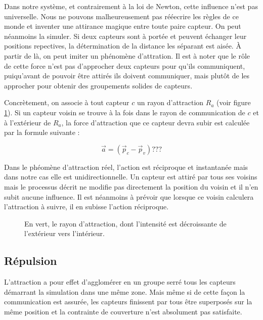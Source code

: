 \documentclass[10pt]{article}
\begin{document}
\begin{multicols}{2}
Dans notre système, et contrairement à la loi de Newton, cette
influence n'est pas universelle. Nous ne pouvons malheureusement pas
rééecrire les règles de ce monde et inventer une attirance magique
entre toute paire capteur. On peut néanmoins la simuler. Si deux
capteurs sont à portée et peuvent échanger leur positions repectives,
la détermination de la distance les séparant est aisée. \`A partir de
là, on peut imiter un phénomène d'attration. Il est à noter que le
rôle de cette force n'est pas d'approcher deux capteurs pour qu'ils
communiquent, puiqu'avant de pouvoir être attirés ils doivent
communiquer, mais plutôt de les approcher pour obtenir des groupements
solides de capteurs.

Concrètement, on associe à tout capteur $c$ un rayon d'attraction
$R_a$ (voir figure \ref{attraction}). Si un capteur voisin se trouve à
la fois dans le rayon de communication de $c$ et à l'extérieur de
$R_a$, la force d'attraction que ce capteur devra subir est calculée
par la formule suivante :

$$
\vec{a} = (\vec{p}_c - \vec{p}_v) ???
$$

Dans le phéomène d'attraction réel, l'action est réciproque et
instantanée mais dans notre cas elle est unidirectionnelle. Un capteur
est attiré par tous ses voisins mais le processus décrit ne modifie
pas directement la position du voisin et il n'en subit aucune
influence. Il est néanmoins à prévoir que lorsque ce voisin calculera
l'attraction à suivre, il en subisse l'action réciproque.

\begin{figure}[H]

  \centering

  

  \caption{En vert, le rayon d'attraction, dont l'intensité est
    décroissante de l'extérieur vers l'intérieur.}
  \label{attraction}

\end{figure}

\subsection{Répulsion}

L'attraction a pour effet d'agglomérer en un groupe serré tous les
capteurs démarrant la simulation dans une même zone. Mais même si de
cette façon la communication est assurée, les capteurs finissent par
tous être superposés sur la même position et la contrainte de
couverture n'est absolument pas satisfaite.


\end{multicols}
\end{document}
